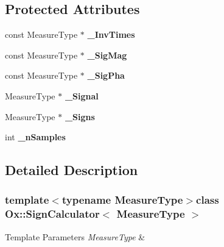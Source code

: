 \subsection*{Protected Attributes}
\begin{DoxyCompactItemize}
\item 
\hypertarget{class_ox_1_1_sign_calculator_a46be35659f793c2e1280a975f799db4d}{const Measure\-Type $\ast$ {\bfseries \-\_\-\-Inv\-Times}}\label{class_ox_1_1_sign_calculator_a46be35659f793c2e1280a975f799db4d}

\item 
\hypertarget{class_ox_1_1_sign_calculator_a635a62974bc9b9f30d0d560a84fcf3f1}{const Measure\-Type $\ast$ {\bfseries \-\_\-\-Sig\-Mag}}\label{class_ox_1_1_sign_calculator_a635a62974bc9b9f30d0d560a84fcf3f1}

\item 
\hypertarget{class_ox_1_1_sign_calculator_a19b203aacea5e39bc9675a27c57197d3}{const Measure\-Type $\ast$ {\bfseries \-\_\-\-Sig\-Pha}}\label{class_ox_1_1_sign_calculator_a19b203aacea5e39bc9675a27c57197d3}

\item 
\hypertarget{class_ox_1_1_sign_calculator_aaf53cad7c5d49133017677f8abb589bf}{Measure\-Type $\ast$ {\bfseries \-\_\-\-Signal}}\label{class_ox_1_1_sign_calculator_aaf53cad7c5d49133017677f8abb589bf}

\item 
\hypertarget{class_ox_1_1_sign_calculator_a6dda6e1e4d83dd7ad4654f7fd2b44bb3}{Measure\-Type $\ast$ {\bfseries \-\_\-\-Signs}}\label{class_ox_1_1_sign_calculator_a6dda6e1e4d83dd7ad4654f7fd2b44bb3}

\item 
\hypertarget{class_ox_1_1_sign_calculator_a133488500068bccf0e041d9244a09e02}{int {\bfseries \-\_\-n\-Samples}}\label{class_ox_1_1_sign_calculator_a133488500068bccf0e041d9244a09e02}

\end{DoxyCompactItemize}


\subsection{Detailed Description}
\subsubsection*{template$<$typename Measure\-Type$>$class Ox\-::\-Sign\-Calculator$<$ Measure\-Type $>$}


\begin{DoxyTemplParams}{Template Parameters}
{\em Measure\-Type} & \\
\hline
\end{DoxyTemplParams}


